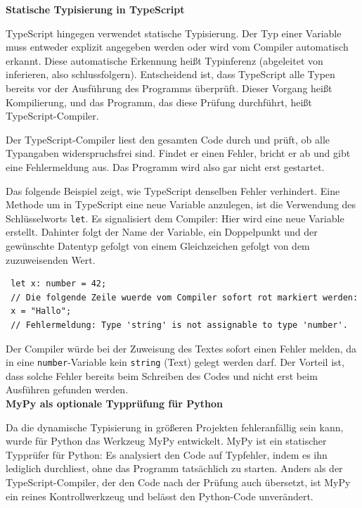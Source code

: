 \textbf{Statische Typisierung in TypeScript}

TypeScript hingegen verwendet statische Typisierung.
Der Typ einer Variable muss entweder explizit angegeben werden oder wird vom Compiler automatisch erkannt. Diese automatische Erkennung heißt Typinferenz (abgeleitet von inferieren, also schlussfolgern).
Entscheidend ist, dass TypeScript alle Typen bereits vor der Ausführung des Programms überprüft.
Dieser Vorgang heißt Kompilierung, und das Programm, das diese Prüfung durchführt, heißt TypeScript-Compiler.

Der TypeScript-Compiler liest den gesamten Code durch und prüft, ob alle Typangaben widerspruchsfrei sind.
Findet er einen Fehler, bricht er ab und gibt eine Fehlermeldung aus. Das Programm wird also gar nicht erst gestartet.

Das folgende Beispiel zeigt, wie TypeScript denselben Fehler verhindert. Eine Methode um in TypeScript eine neue Variable anzulegen, ist die Verwendung des Schlüsselworts \texttt{let}. Es signalisiert dem Compiler: Hier wird eine neue Variable erstellt.  Dahinter folgt der Name der Variable, ein Doppelpunkt und der gewünschte Datentyp gefolgt von einem Gleichzeichen gefolgt von dem zuzuweisenden Wert. \\

\begin{verbatim}
 let x: number = 42;
 // Die folgende Zeile wuerde vom Compiler sofort rot markiert werden:
 x = "Hallo";
 // Fehlermeldung: Type 'string' is not assignable to type 'number'.
\end{verbatim}

Der Compiler würde bei der Zuweisung des Textes sofort einen Fehler melden, da in eine \texttt{number}-Variable kein \texttt{string} (Text) gelegt werden darf.
Der Vorteil ist, dass solche Fehler bereits beim Schreiben des Codes und nicht erst beim Ausführen gefunden werden.\\

\textbf{MyPy als optionale Typprüfung für Python}

Da die dynamische Typisierung in größeren Projekten fehleranfällig sein kann, wurde für Python das Werkzeug MyPy entwickelt.
MyPy ist ein statischer Typprüfer für Python: Es analysiert den Code auf Typfehler, indem es ihn lediglich durchliest, ohne das Programm tatsächlich zu starten. Anders als der TypeScript-Compiler, der den Code nach der Prüfung auch übersetzt, ist MyPy ein reines Kontrollwerkzeug und belässt den Python-Code unverändert.


